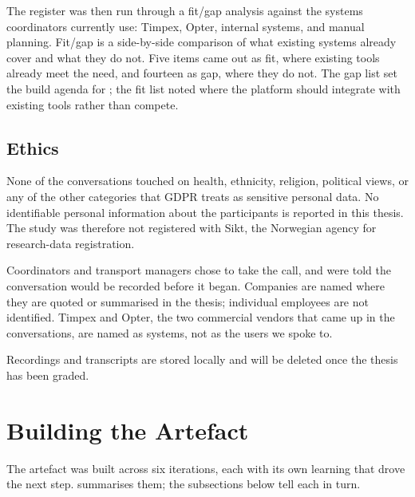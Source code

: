 The register was then run through a fit/gap analysis against the systems coordinators currently use: Timpex, Opter, internal systems, and manual planning. Fit/gap is a side-by-side comparison of what existing systems already cover and what they do not. Five items came out as fit, where existing tools already meet the need, and fourteen as gap, where they do not. The gap list set the build agenda for ; the fit list noted where the platform should integrate with existing tools rather than compete.

\subsection{Ethics}
\label{sec:ethics}

None of the conversations touched on health, ethnicity, religion, political views, or any of the other categories that GDPR treats as sensitive personal data. No identifiable personal information about the participants is reported in this thesis. The study was therefore not registered with Sikt, the Norwegian agency for research-data registration.

Coordinators and transport managers chose to take the call, and were told the conversation would be recorded before it began. Companies are named where they are quoted or summarised in the thesis; individual employees are not identified. Timpex and Opter, the two commercial vendors that came up in the conversations, are named as systems, not as the users we spoke to.

Recordings and transcripts are stored locally and will be deleted once the thesis has been graded.


\section{Building the Artefact}
\label{sec:building-artefact}
\label{sec:iterations}

The artefact was built across six iterations, each with its own learning that drove the next step.  summarises them; the subsections below tell each in turn.

